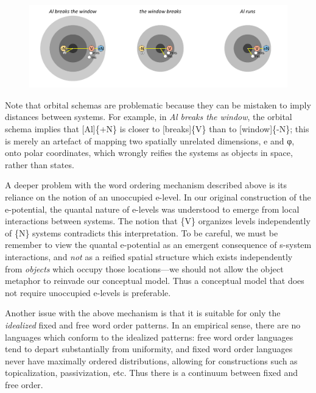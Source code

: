   
\begin{figure}
\includegraphics[width=\textwidth]{figures/Tilsen-img76.png}
\caption{\missingcaption}
\label{fig:4:26}
\end{figure}
 

  Note that orbital schemas are problematic because they can be mistaken to imply distances between systems. For example, in \textit{Al breaks the window}, the orbital schema implies that [Al]\{+N\} is closer to [breaks]\{V\} than to [window]\{-N\}; this is merely an artefact of mapping two spatially unrelated dimensions, e and φ, onto polar coordinates, which wrongly reifies the systems as objects in space, rather than states.

  A deeper problem with the word ordering mechanism described above is its reliance on the notion of an unoccupied e-level. In our original construction of the e-potential, the quantal nature of e-levels was understood to emerge from local interactions between systems. The notion that \{V\} organizes levels independently of \{N\} systems contradicts this interpretation. To be careful, we must be remember to view the quantal e-potential as an emergent consequence of s-system interactions, and \textit{not} as a reified spatial structure which exists independently from \textit{objects} which occupy those locations—we should not allow the object metaphor to reinvade our conceptual model. Thus a conceptual model that does not require unoccupied e-levels is preferable.

  Another issue with the above mechanism is that it is suitable for only the \textit{idealized} fixed and free word order patterns. In an empirical sense, there are no languages which conform to the idealized patterns: free word order languages tend to depart substantially from uniformity, and fixed word order languages never have maximally ordered distributions, allowing for constructions such as topicalization, passivization, etc. Thus there is a continuum between fixed and free order. 

